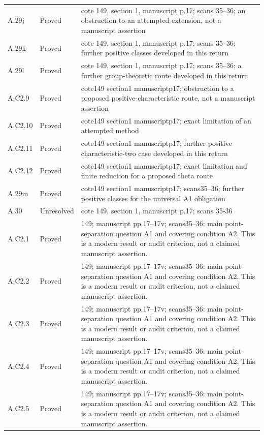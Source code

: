{\begin{longtable}{p{1.9cm}p{1.7cm}p{10.3cm}}
A.29j & Proved & cote 149, section 1, manuscript p.17; scans 35–36; an obstruction to an attempted extension, not a manuscript assertion \\
A.29k & Proved & cote 149, section 1, manuscript p.17; scans 35–36; further positive classes developed in this return \\
A.29l & Proved & cote 149, section 1, manuscript p.17; scans 35–36; a further group-theoretic route developed in this return \\
A.C2.9 & Proved & cote149 section1 manuscriptp17; obstruction to a proposed positive-characteristic route, not a manuscript assertion \\
A.C2.10 & Proved & cote149 section1 manuscriptp17; exact limitation of an attempted method \\
A.C2.11 & Proved & cote149 section1 manuscriptp17; further positive characteristic-two case developed in this return \\
A.C2.12 & Proved & cote149 section1 manuscriptp17; exact limitation and finite reduction for a proposed theta route \\
A.29m & Proved & cote149 section1 manuscriptp17; scans35–36; further positive classes for the universal A1 obligation \\
A.30 & Unresolved & cote 149, section 1, manuscript p.17; scans 35-36 \\
A.C2.1 & Proved & 149; manuscript pp.17–17v; scans35–36: main point-separation question A1 and covering condition A2. This is a modern result or audit criterion, not a claimed manuscript assertion. \\
A.C2.2 & Proved & 149; manuscript pp.17–17v; scans35–36: main point-separation question A1 and covering condition A2. This is a modern result or audit criterion, not a claimed manuscript assertion. \\
A.C2.3 & Proved & 149; manuscript pp.17–17v; scans35–36: main point-separation question A1 and covering condition A2. This is a modern result or audit criterion, not a claimed manuscript assertion. \\
A.C2.4 & Proved & 149; manuscript pp.17–17v; scans35–36: main point-separation question A1 and covering condition A2. This is a modern result or audit criterion, not a claimed manuscript assertion. \\
A.C2.5 & Proved & 149; manuscript pp.17–17v; scans35–36: main point-separation question A1 and covering condition A2. This is a modern result or audit criterion, not a claimed manuscript assertion. \\

\end{longtable}}
